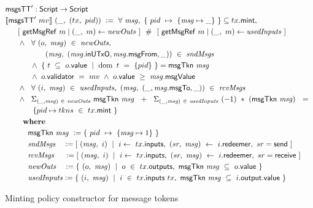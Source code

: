 %
\begin{figure}
  \begin{align*}
    & \mathsf{msgsTT}' : \textsf{Script} \to \textsf{Script} \\
    &\llbracket\mathsf{msgsTT}'~mv\rrbracket~(\_,~(tx,~pid))~\mathrel{\mathop:}= ~\forall~\mathit{msg},~\{~pid ~\mapsto~ \{\mathit{msg} \mapsto \_\}~\} \subseteq tx.\mathsf{mint},\\
    &~~~~~[~\mathsf{getMsgRef}~ m \mid (\_,\ m) \leftarrow \mathit{newOuts}~]~~\#~~
          [~\mathsf{getMsgRef}~ m \mid (\_,\ m) \leftarrow \mathit{usedInputs}~] \\
    &~~~~~\wedge~~\forall~(o,~\mathit{msg})~\in~\mathit{newOuts},~ \\
    &~~~~~~~~~~~~~~~~(\mathit{msg},~(\mathit{msg}.\mathsf{inUTxO}, \mathit{msg}.\mathsf{msgFrom}, \_))~\in~\mathit{sndMsgs} \\
    &~~~~~~~~~~\wedge~\{~t~ \subseteq~o.\mathsf{value}~\mid~\operatorname{dom}~t~=~\{pid\}~\} = \mathsf{msgTkn}~\mathit{msg} \\
    &~~~~~~~~~~\wedge~o.\mathsf{validator}~=~mv~\wedge~o.\mathsf{value}~\geq~\mathit{msg}.\mathsf{msgValue} \\
    &~~~~~\wedge~~\forall~(i,~\mathit{msg})~\in~\mathit{usedInputs},\
    (\mathit{msg},~(\_, \mathit{msg}.\mathsf{msgTo}, \_))~\in~\mathit{rcvMsgs}\\
    &~~~~~\wedge~~\Sigma_{(\_,\mathit{msg})~\in~\mathit{newOuts}}~\mathsf{msgTkn}~\mathit{msg} ~~+~~
    \Sigma_{(\_, \mathit{msg})~\in~\mathit{usedInputs}}~(-1) ~*~ (\mathsf{msgTkn}~\mathit{msg}) ~~=~~\\
    &~~~~~~~~~~~\{pid \mapsto tkns~\in~tx.\mathsf{mint}~\} \\
    &~~~~~~ ~ \mathbf{where}~ ~  \\
    &~~~~~~~~~\mathsf{msgTkn}~\mathit{msg}~\mathrel{\mathop:}= \{~pid ~\mapsto~ \{\mathit{msg} \mapsto 1\}~\} \\
    &~~~~~~~~~\mathit{sndMsgs}~~~\mathrel{\mathop:}= [~ (\mathit{msg},~i)~\mid~i\leftarrow~tx.\mathsf{inputs},
    ~(sr,~\mathit{msg})~ \leftarrow~ i.\mathsf{redeemer},~sr=\mathsf{send}~] \\
    &~~~~~~~~~\mathit{rcvMsgs}~~~~\mathrel{\mathop:}= [~ (\mathit{msg},~i)~\mid~i\leftarrow~tx.\mathsf{inputs},
    ~(sr,~\mathit{msg})~\leftarrow~i.\mathsf{redeemer},~sr=\mathsf{receive}~] \\
    &~~~~~~~~~\mathit{newOuts}~~~\mathrel{\mathop:}= \{~(o,~\mathit{msg})~\mid~o~\in~tx.\mathsf{outputs},~
    \mathsf{msgTkn}~\mathit{msg}~\subseteq~o.\mathsf{value}~\} \\
    &~~~~~~~~~\mathit{usedInputs} \mathrel{\mathop:}= \{~ (i,~\mathit{msg})~\mid~
    i~ \in~ tx.\mathsf{inputs}~tx,~\mathsf{msgTkn}~\mathit{msg}~\subseteq~i.\mathsf{output}.\mathsf{value} ~\} \\
  \end{align*}
\caption{Minting policy constructor for message tokens}
\label{fig:msgs-codeTT}
\end{figure}

